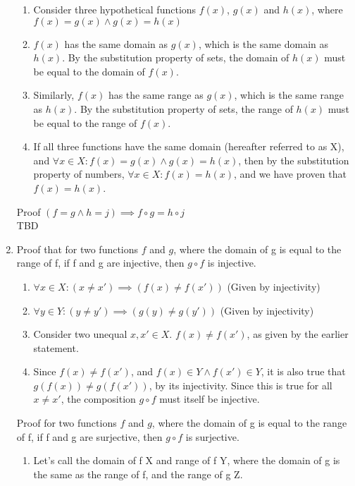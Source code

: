 \documentclass{article}
\begin{document}
\begin{enumerate}
\begin{enumerate}
                \item Consider three hypothetical functions $f(x)$, $g(x)$ and $h(x)$, where $f(x)=g(x) \land g(x)=h(x)$
                \item $f(x)$ has the same domain as $g(x)$, which is the same domain as $h(x)$. By the substitution property of sets,
                    the domain of $h(x)$ must be equal to the domain of $f(x)$.
                \item Similarly, $f(x)$ has the same range as $g(x)$, which is the same range as $h(x)$. By the substitution property of sets,
                    the range of $h(x)$ must be equal to the range of $f(x)$.
                \item If all three functions have the same domain (hereafter referred to as X), and $\forall x \in X: f(x) = g(x) \land g(x) = h(x)$,
                    then by the substitution property of numbers, $\forall x \in X: f(x) = h(x)$, and we have proven that $f(x) = h(x)$.
            \end{enumerate}
            Proof $(f = g \land h = j) \implies f \circ g = h \circ j$ \\
            TBD
        \item Proof that for two functions $f$ and $g$, where the domain of g is
            equal to the range of f, if f and g are injective, then $g \circ f$
            is injective.
            \begin{enumerate}
                \item $\forall x \in X: (x \neq x') \implies (f(x) \neq f(x'))$ (Given by injectivity)
                \item $\forall y \in Y: (y \neq y') \implies (g(y) \neq g(y'))$ (Given by injectivity)
                \item Consider two unequal $x,x' \in X$. $f(x) \neq f(x')$, as given by the earlier statement.
                \item Since $f(x) \neq f(x')$, and $f(x) \in Y \land f(x') \in
                    Y$, it is also true that $g(f(x)) \neq g(f(x'))$, by its
                    injectivity. Since this is true for all $x \neq x'$, the
                    composition $g \circ f$ must itself be injective.
            \end{enumerate}
            Proof for two functions $f$ and $g$, where the domain of g is
            equal to the range of f, if f and g are surjective, then $g \circ f$
            is surjective.
            \begin{enumerate}
                \item Let's call the domain of f X and range of f Y, where the domain of g is the same as the range of f, and the range of g Z.

\end{enumerate}
\end{enumerate}
\end{document}
